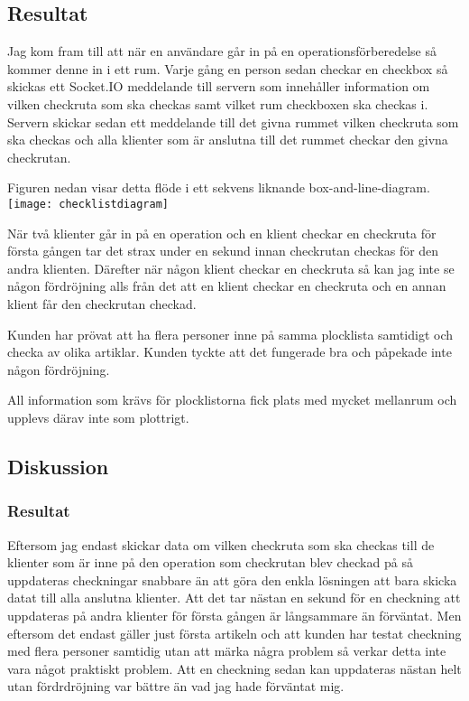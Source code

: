 \subsection{Resultat}
Jag kom fram till att när en användare går in på en operationsförberedelse så kommer denne in i ett rum. Varje gång en person sedan checkar en checkbox så skickas ett Socket.IO meddelande till servern som innehåller information om vilken checkruta som ska checkas samt vilket rum checkboxen ska checkas i. Servern skickar sedan ett meddelande till det givna rummet vilken checkruta som ska checkas och alla klienter som är anslutna till det rummet checkar den givna checkrutan.

Figuren nedan visar detta flöde i ett sekvens liknande box-and-line-diagram.
\texttt{[image: checklistdiagram]}

När två klienter går in på en operation och en klient checkar en checkruta för första gången tar det strax under en sekund innan checkrutan checkas för den andra klienten. Därefter när någon klient checkar en checkruta så kan jag inte se någon fördröjning alls från det att en klient checkar en checkruta och en annan klient får den checkrutan checkad.

Kunden har prövat att ha flera personer inne på samma plocklista samtidigt och checka av olika artiklar. Kunden tyckte att det fungerade bra och påpekade inte någon fördröjning. 

All information som krävs för plocklistorna fick plats med mycket mellanrum och upplevs därav inte som plottrigt.

\subsection{Diskussion}
\subsubsection{Resultat}
Eftersom jag endast skickar data om vilken checkruta som ska checkas till de klienter som är inne på den operation som checkrutan blev checkad på så uppdateras checkningar snabbare än att göra den enkla lösningen att bara skicka datat till alla anslutna klienter. Att det tar nästan en sekund för en checkning att uppdateras på andra klienter för första gången är långsammare än förväntat. Men eftersom det endast gäller just första artikeln och att kunden har testat checkning med flera personer samtidig utan att märka några problem så verkar detta inte vara något praktiskt problem. Att en checkning sedan kan uppdateras nästan helt utan fördrdröjning var bättre än vad jag hade förväntat mig.

